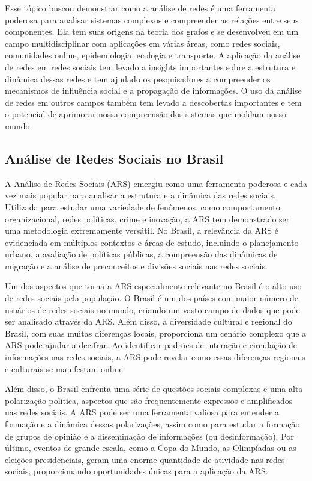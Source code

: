 Esse tópico buscou demonstrar como a análise de redes é uma ferramenta poderosa para analisar sistemas complexos e compreender as relações entre seus componentes. Ela tem suas origens na teoria dos grafos e se desenvolveu em um campo multidisciplinar com aplicações em várias áreas, como redes sociais, comunidades online, epidemiologia, ecologia e transporte. A aplicação da análise de redes em redes sociais tem levado a insights importantes sobre a estrutura e dinâmica dessas redes e tem ajudado os pesquisadores a compreender os mecanismos de influência social e a propagação de informações. O uso da análise de redes em outros campos também tem levado a descobertas importantes e tem o potencial de aprimorar nossa compreensão dos sistemas que moldam nosso mundo.

\subsection*{Análise de Redes Sociais no Brasil}

A Análise de Redes Sociais (ARS) emergiu como uma ferramenta poderosa e cada vez mais popular para analisar a estrutura e a dinâmica das redes sociais. Utilizada para estudar uma variedade de fenômenos, como comportamento organizacional, redes políticas, crime e inovação, a ARS tem demonstrado ser uma metodologia extremamente versátil. No Brasil, a relevância da ARS é evidenciada em múltiplos contextos e áreas de estudo, incluindo o planejamento urbano, a avaliação de políticas públicas, a compreensão das dinâmicas de migração e a análise de preconceitos e divisões sociais nas redes sociais.

Um dos aspectos que torna a ARS especialmente relevante no Brasil é o alto uso de redes sociais pela população. O Brasil é um dos países com maior número de usuários de redes sociais no mundo, criando um vasto campo de dados que pode ser analisado através da ARS. Além disso, a diversidade cultural e regional do Brasil, com suas muitas diferenças locais, proporciona um cenário complexo que a ARS pode ajudar a decifrar. Ao identificar padrões de interação e circulação de informações nas redes sociais, a ARS pode revelar como essas diferenças regionais e culturais se manifestam online.

Além disso, o Brasil enfrenta uma série de questões sociais complexas e uma alta polarização política, aspectos que são frequentemente expressos e amplificados nas redes sociais. A ARS pode ser uma ferramenta valiosa para entender a formação e a dinâmica dessas polarizações, assim como para estudar a formação de grupos de opinião e a disseminação de informações (ou desinformação). Por último, eventos de grande escala, como a Copa do Mundo, as Olimpíadas ou as eleições presidenciais, geram uma enorme quantidade de atividade nas redes sociais, proporcionando oportunidades únicas para a aplicação da ARS.

